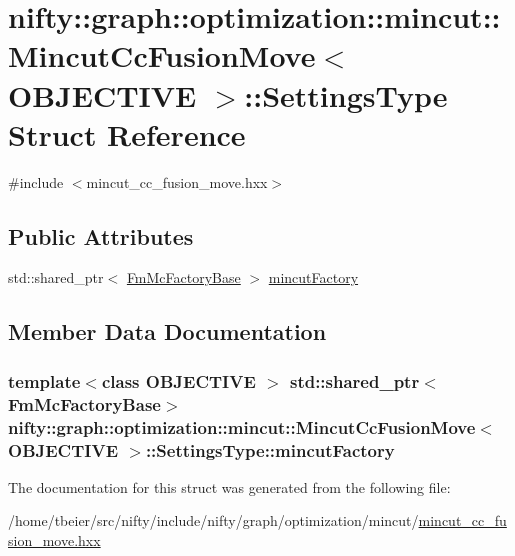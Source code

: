 \hypertarget{structnifty_1_1graph_1_1optimization_1_1mincut_1_1MincutCcFusionMove_1_1SettingsType}{}\section{nifty\+:\+:graph\+:\+:optimization\+:\+:mincut\+:\+:Mincut\+Cc\+Fusion\+Move$<$ O\+B\+J\+E\+C\+T\+I\+V\+E $>$\+:\+:Settings\+Type Struct Reference}
\label{structnifty_1_1graph_1_1optimization_1_1mincut_1_1MincutCcFusionMove_1_1SettingsType}


{\ttfamily \#include $<$mincut\+\_\+cc\+\_\+fusion\+\_\+move.\+hxx$>$}

\subsection*{Public Attributes}
\begin{DoxyCompactItemize}
\item 
std\+::shared\+\_\+ptr$<$ \hyperlink{classnifty_1_1graph_1_1optimization_1_1mincut_1_1MincutCcFusionMove_aa1890aca393a3d5f4ee342304d74ddba}{Fm\+Mc\+Factory\+Base} $>$ \hyperlink{structnifty_1_1graph_1_1optimization_1_1mincut_1_1MincutCcFusionMove_1_1SettingsType_a1eba1d8b28f37e11d5d74f288f946e12}{mincut\+Factory}
\end{DoxyCompactItemize}


\subsection{Member Data Documentation}
\hypertarget{structnifty_1_1graph_1_1optimization_1_1mincut_1_1MincutCcFusionMove_1_1SettingsType_a1eba1d8b28f37e11d5d74f288f946e12}{}
\subsubsection[{mincut\+Factory}]{\setlength{\rightskip}{0pt plus 5cm}template$<$class O\+B\+J\+E\+C\+T\+I\+V\+E $>$ std\+::shared\+\_\+ptr$<${\bf Fm\+Mc\+Factory\+Base}$>$ {\bf nifty\+::graph\+::optimization\+::mincut\+::\+Mincut\+Cc\+Fusion\+Move}$<$ O\+B\+J\+E\+C\+T\+I\+V\+E $>$\+::Settings\+Type\+::mincut\+Factory}\label{structnifty_1_1graph_1_1optimization_1_1mincut_1_1MincutCcFusionMove_1_1SettingsType_a1eba1d8b28f37e11d5d74f288f946e12}


The documentation for this struct was generated from the following file\+:\begin{DoxyCompactItemize}
\item 
/home/tbeier/src/nifty/include/nifty/graph/optimization/mincut/\hyperlink{mincut__cc__fusion__move_8hxx}{mincut\+\_\+cc\+\_\+fusion\+\_\+move.\+hxx}\end{DoxyCompactItemize}
